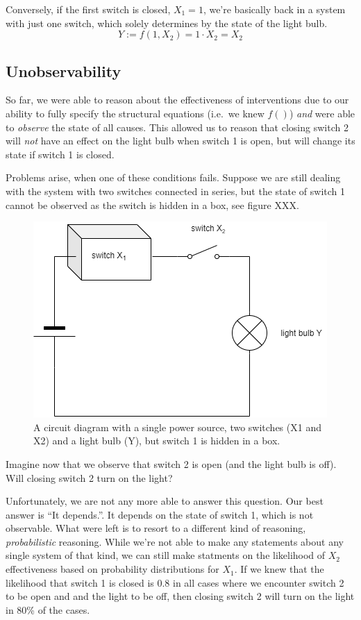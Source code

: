 \documentclass[
]{book}
\theoremstyle{definition}
\theoremstyle{definition}
\theoremstyle{definition}
\theoremstyle{remark}
\begin{document}
Conversely, if the first switch is closed, \(X_1 = 1\), we're basically back in a system with just one switch, which solely determines by the state of the light bulb.
\begin{equation}
Y := f(1, X_2) = 1 \cdot X_2 = X_2
\end{equation}

\hypertarget{unobservability}{%
\subsection{Unobservability}\label{unobservability}}

So far, we were able to reason about the effectiveness of interventions due to our ability to fully specify the structural equations (i.e.~we knew \(f()\)) \emph{and} were able to \emph{observe} the state of all causes. This allowed us to reason that closing switch 2 will \emph{not} have an effect on the light bulb when switch 1 is open, but will change its state if switch 1 is closed.

Problems arise, when one of these conditions fails. Suppose we are still dealing with the system with two switches connected in series, but the state of switch 1 cannot be observed as the switch is hidden in a box, see figure XXX.

\begin{figure}
\centering
\includegraphics{images/causal_models-hidden_electric_2.png}
\caption{A circuit diagram with a single power source, two switches (X1 and X2) and a light bulb (Y), but switch 1 is hidden in a box.}
\end{figure}

Imagine now that we observe that switch 2 is open (and the light bulb is off). Will closing switch 2 turn on the light?

Unfortunately, we are not any more able to answer this question. Our best answer is ``It depends.''. It depends on the state of switch 1, which is not observable. What were left is to resort to a different kind of reasoning, \emph{probabilistic} reasoning. While we're not able to make any statements about any single system of that kind, we can still make statments on the likelihood of \(X_2\) effectiveness based on probability distributions for \(X_1\). If we knew that the likelihood that switch 1 is closed is 0.8 in all cases where we encounter switch 2 to be open and and the light to be off, then closing switch 2 will turn on the light in 80\% of the cases.
\end{document}
